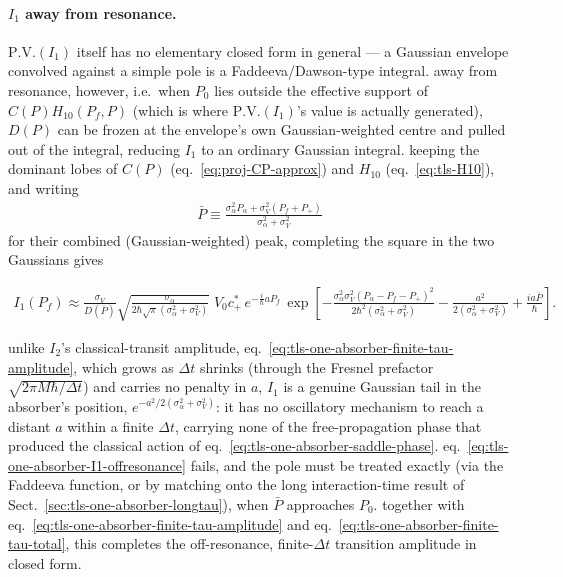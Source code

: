 \paragraph{$I_1$ away from resonance.} $\text{P.V.}(I_1)$ itself has no elementary closed form in general --- a Gaussian envelope convolved against a simple pole is a Faddeeva/Dawson-type integral. away from resonance, however, i.e.\ when $P_0$ lies outside the effective support of $C(P)H_{10}(P_f,P)$ (which is where $\text{P.V.}(I_1)$'s value is actually generated), $D(P)$ can be frozen at the envelope's own Gaussian-weighted centre and pulled out of the integral, reducing $I_1$ to an ordinary Gaussian integral. keeping the dominant lobes of $C(P)$ (eq.~\eqref{eq:proj-CP-approx}) and $H_{10}$ (eq.~\eqref{eq:tls-H10}), and writing
\begin{align}
    \bar P \equiv \frac{\sigma_\alpha^2 P_\alpha+\sigma_V^2(P_f+P_+)}{\sigma_\alpha^2+\sigma_V^2}
\end{align}
for their combined (Gaussian-weighted) peak, completing the square in the two Gaussians gives
\begin{importantbox}
    \begin{align}
        I_1(P_f) \approx \frac{\sigma_V}{D(\bar P)}\sqrt{\frac{\sigma_\alpha}{2\hbar\sqrt\pi(\sigma_\alpha^2+\sigma_V^2)}}\;V_0c_+^*\,e^{-\frac{i}{\hbar}aP_f}\,\exp\left[-\frac{\sigma_\alpha^2\sigma_V^2(P_\alpha-P_f-P_+)^2}{2\hbar^2(\sigma_\alpha^2+\sigma_V^2)}-\frac{a^2}{2(\sigma_\alpha^2+\sigma_V^2)}+\frac{ia\bar P}{\hbar}\right].\label{eq:tls-one-absorber-I1-offresonance}
    \end{align}
\end{importantbox}
unlike $I_2$'s classical-transit amplitude, eq.~\eqref{eq:tls-one-absorber-finite-tau-amplitude}, which grows as $\Delta t$ shrinks (through the Fresnel prefactor $\sqrt{2\pi M\hbar/\Delta t}$) and carries no penalty in $a$, $I_1$ is a genuine Gaussian tail in the absorber's position, $e^{-a^2/2(\sigma_\alpha^2+\sigma_V^2)}$: it has no oscillatory mechanism to reach a distant $a$ within a finite $\Delta t$, carrying none of the free-propagation phase that produced the classical action of eq.~\eqref{eq:tls-one-absorber-saddle-phase}. eq.~\eqref{eq:tls-one-absorber-I1-offresonance} fails, and the pole must be treated exactly (via the Faddeeva function, or by matching onto the long interaction-time result of Sect.~\ref{sec:tls-one-absorber-longtau}), when $\bar P$ approaches $P_0$. together with eq.~\eqref{eq:tls-one-absorber-finite-tau-amplitude} and eq.~\eqref{eq:tls-one-absorber-finite-tau-total}, this completes the off-resonance, finite-$\Delta t$ transition amplitude in closed form.
